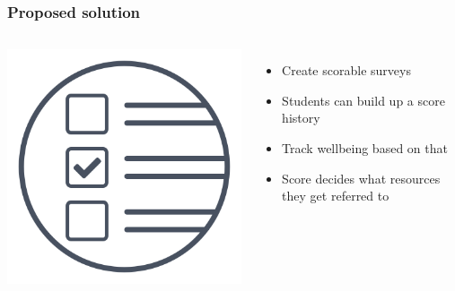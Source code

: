 \documentclass{beamer}
\begin{document}
\begin{frame}
    \frametitle{Proposed solution} 
    \begin{columns}
        \includegraphics[width=1\textwidth]{images/icon-actions.png}
        
        \begin{itemize}
            \pause
            \item Create scorable surveys 
            \pause
            \vspace{.2cm}
            \item Students can build up a score history
            \pause
            \vspace{.2cm}
            \item Track wellbeing based on that
            \pause
            \vspace{.2cm}
            \item Score decides what resources they get referred to
        \end{itemize}
    \end{columns}
    

\end{frame}
\end{document}
